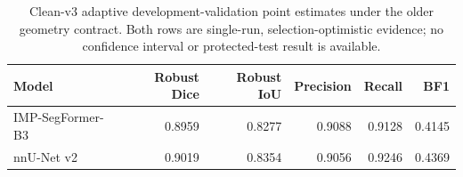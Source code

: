 
\begin{table}[t]
\centering
\caption{Clean-v3 adaptive development-validation point estimates under the older geometry contract. Both rows are single-run, selection-optimistic evidence; no confidence interval or protected-test result is available.}
\label{tab:clean-v3-validation}
\begin{tabular}{lrrrrr}
\toprule
Model & Robust Dice & Robust IoU & Precision & Recall & BF1 \\
\midrule
IMP-SegFormer-B3 & 0.8959 & 0.8277 & 0.9088 & 0.9128 & 0.4145 \\
nnU-Net v2 & 0.9019 & 0.8354 & 0.9056 & 0.9246 & 0.4369 \\
\bottomrule
\end{tabular}
\end{table}
